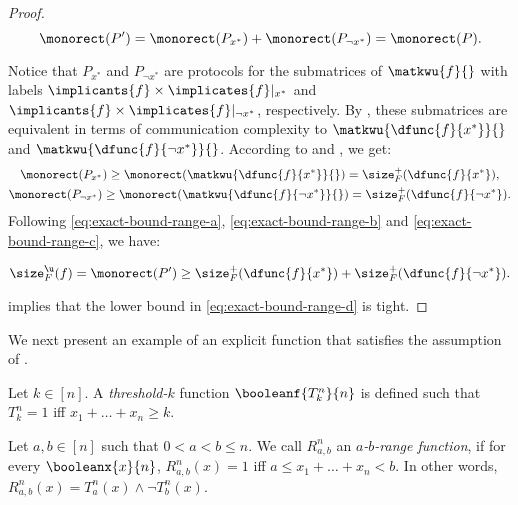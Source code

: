 \documentclass[acmsmall, nonacm, authorversion]{acmart}
\begin{document}
\begin{proof}
\begin{equation}\label{eq:exact-bound-range-a}
\monorect(P')=\monorect(P_{x^*})+\monorect(P_{\neg x^*})=\monorect(P).
\end{equation}

Notice that $P_{x^*}$ and $P_{\neg x^*}$ are protocols for the submatrices of $\matkwu{f}{}$ with labels $\implicants{f}\times \implicates{f}|_{x^*}$ and $\implicants{f}\times \implicates{f}|_{\neg x^*}$, respectively. By , these submatrices are equivalent in terms of communication complexity to $\matkwu{\dfunc{f}{x^*}}{}$ and $\matkwu{\dfunc{f}{\neg x^*}}{}$. According to  and , we get:
\begin{gather}
\monorect(P_{x^*})\ge \monorect(\matkwu{\dfunc{f}{x^*}}{})=\size_F^+(\dfunc{f}{x^*}), \label{eq:exact-bound-range-b} \\ \monorect(P_{\neg x^*}) \ge \monorect(\matkwu{\dfunc{f}{\neg x^*}}{}) =\size_F^+(\dfunc{f}{\neg x^*}). \label{eq:exact-bound-range-c}
\end{gather}
Following \eqref{eq:exact-bound-range-a}, \eqref{eq:exact-bound-range-b} and \eqref{eq:exact-bound-range-c}, we have:

\begin{equation}\label{eq:exact-bound-range-d}
\size_F^\u(f)=\monorect(P')\ge \size_F^+(\dfunc{f}{x^*})+ \size_F^+(\dfunc{f}{\neg x^*}).
\end{equation}

 implies that the lower bound in \eqref{eq:exact-bound-range-d} is tight.
\end{proof}

We next present an example of an explicit function that satisfies the assumption of .

\begin{definition}\label{def:range-functions}
Let $k\in [n]$. A \emph{threshold-$k$} function $\booleanf{T_k^n}{n}$ is defined such that $T_k^n=1$ iff $x_1+\dots+x_n\ge k$.

Let $a,b\in [n]$ such that $0<a<b\le n$. We call $R_{a,b}^n$ an \emph{$a$-$b$-range function}, if for every $\booleanx{x}{n}$, $R_{a,b}^n(x)=1$ iff $a\leq x_1+\dots+x_n<b$. In other words, $R_{a,b}^n(x)=T^n_a(x) \land \neg T^n_b(x)$.
\end{definition}
\end{document}

